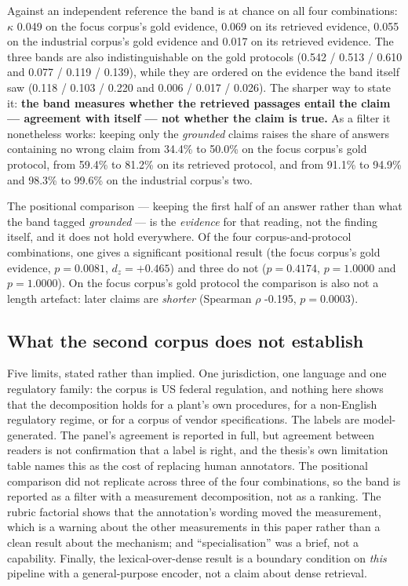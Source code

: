 \documentclass[preprint,3p,times]{elsarticle}
\begin{document}
Against an independent reference the band is at chance on all four
combinations: $\kappa$ 0.049 on the focus corpus's gold
evidence, 0.069 on its retrieved evidence, 0.055 on the
industrial corpus's gold evidence and 0.017 on its retrieved
evidence. The three bands are also indistinguishable on the gold protocols
(0.542 / 0.513 / 0.610 and
0.077 / 0.119 / 0.139), while they are
ordered on the evidence the band itself saw
(0.118 / 0.103 / 0.220 and
0.006 / 0.017 / 0.026). The sharper
way to state it: \textbf{the band measures whether the retrieved passages
entail the claim --- agreement with itself --- not whether the claim is
true.} As a filter it nonetheless works: keeping only the
\emph{grounded} claims raises the share of answers containing no wrong
claim from 34.4\% to 50.0\% on the focus corpus's
gold protocol, from 59.4\% to 81.2\% on its retrieved
protocol, and from 91.1\% to 94.9\% and
98.3\% to 99.6\% on the industrial corpus's two.

The positional comparison --- keeping the first half of an answer rather
than what the band tagged \emph{grounded} --- is the \emph{evidence} for
that reading, not the finding itself, and it does not hold everywhere. Of
the four corpus-and-protocol combinations, one gives a significant
positional result (the focus corpus's gold evidence,
$p=0.0081$, $d_z=+0.465$)
and three do not ($p=0.4174$, $p=1.0000$ and
$p=1.0000$). On the focus corpus's gold protocol the comparison is
also not a length artefact: later claims are \emph{shorter}
(Spearman $\rho$ -0.195,
$p=0.0003$).

\subsection{What the second corpus does not establish}

Five limits, stated rather than implied. One jurisdiction, one language and
one regulatory family: the corpus is US federal regulation, and nothing here
shows that the decomposition holds for a plant's own procedures, for a
non-English regulatory regime, or for a corpus of vendor specifications.
The labels are model-generated. The panel's agreement is reported in full,
but agreement between readers is not confirmation that a label is right, and
the thesis's own limitation table names this as the cost of replacing human
annotators. The positional comparison did not replicate across three of the
four combinations, so the band is reported as a filter with a measurement
decomposition, not as a ranking. The rubric factorial shows that the
annotation's wording moved the measurement, which is a warning about the
other measurements in this paper rather than a clean result about the
mechanism; and ``specialisation'' was a brief, not a capability. Finally, the
lexical-over-dense result is a boundary condition on \emph{this}
pipeline with a general-purpose encoder, not a claim about dense retrieval.
\end{document}
